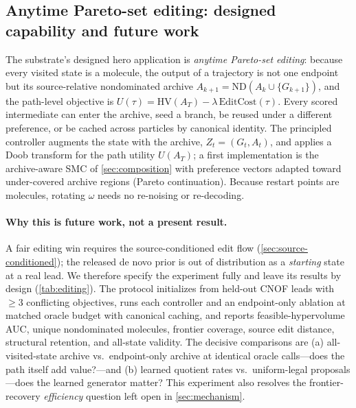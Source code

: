 \documentclass{article}
\theoremstyle{definition}
\theoremstyle{remark}
\begin{document}
\subsection{Anytime Pareto-set editing: designed capability and future work}
\label{sec:editing}

The substrate's designed hero application is \emph{anytime Pareto-set editing}: because every visited state is a molecule, the output of a trajectory is not one endpoint but its source-relative nondominated archive $A_{k+1}=\mathrm{ND}(A_k\cup\{G_{k+1}\})$, and the path-level objective is $U(\tau)=\mathrm{HV}(A_T)-\lambda\,\mathrm{EditCost}(\tau)$. Every scored intermediate can enter the archive, seed a branch, be reused under a different preference, or be cached across particles by canonical identity. The principled controller augments the state with the archive, $Z_t=(G_t,A_t)$, and applies a Doob transform for the path utility $U(A_T)$; a first implementation is the archive-aware SMC of \cref{sec:composition} with preference vectors adapted toward under-covered archive regions (Pareto continuation). Because restart points are molecules, rotating $\omega$ needs no re-noising or re-decoding.

\paragraph{Why this is future work, not a present result.}
A fair editing win requires the source-conditioned edit flow (\cref{sec:source-conditioned}); the released de novo prior is out of distribution as a \emph{starting} state at a real lead. We therefore specify the experiment fully and leave its results \XXX{} by design (\cref{tab:editing}). The protocol initializes from held-out CNOF leads with $\ge 3$ conflicting objectives, runs each controller and an endpoint-only ablation at matched oracle budget with canonical caching, and reports feasible-hypervolume AUC, unique nondominated molecules, frontier coverage, source edit distance, structural retention, and all-state validity. The decisive comparisons are (a) all-visited-state archive vs.\ endpoint-only archive at identical oracle calls---does the path itself add value?---and (b) learned quotient rates vs.\ uniform-legal proposals---does the learned generator matter? This experiment also resolves the frontier-recovery \emph{efficiency} question left open in \cref{sec:mechanism}.
\end{document}

